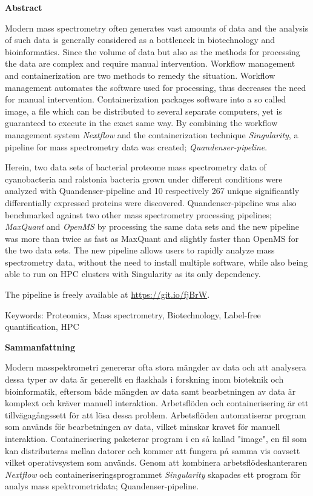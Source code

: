 \begin{center}\normalfont\Large\bfseries\centering Abstract\end{center}
Modern mass spectrometry often generates vast amounts of data and the analysis of such data is generally considered as a bottleneck in biotechnology and bioinformatics. Since the volume of data but also as the methods for processing the data are complex and require manual intervention. Workflow management and containerization are two methods to remedy the situation. Workflow management automates the software used for processing, thus decreases the need for manual intervention. Containerization packages software into a so called image, a file which can be distributed to several separate computers, yet is guaranteed to execute in the exact same way. By combining the workflow management system \textit{Nextflow} and the containerization technique \textit{Singularity}, a pipeline for mass spectrometry data was created; \textit{Quandenser-pipeline}.

Herein, two data sets of bacterial proteome mass spectrometry data of cyanobacteria and ralstonia bacteria grown under different conditions were analyzed with Quandenser-pipeline and 10 respectively 267 unique significantly differentially expressed proteins were discovered. Quandenser-pipeline was also benchmarked against two other mass spectrometry processing pipelines; \textit{MaxQuant} and \textit{OpenMS} by processing the same data sets and the new pipeline was more than twice as fast as MaxQuant and slightly faster than OpenMS for the two data sets. The new pipeline allows users to rapidly analyze mass spectrometry data, without the need to install multiple software, while also being able to run on HPC clusters with Singularity as its only dependency.

The pipeline is freely available at \url{https://git.io/fjBrW}.

\vspace{2cm}

Keywords: Proteomics, Mass spectrometry, Biotechnology, Label-free quantification, HPC

\newpage

\begin{center}\normalfont\Large\bfseries\centering Sammanfattning\end{center}
Modern masspektrometri genererar ofta stora mängder av data och att analysera dessa typer av data är generellt en flaskhals i forskning inom bioteknik och bioinformatik, eftersom både mängden av data samt bearbetningen av data är komplext och kräver manuell interaktion. Arbetsflöden och containerisering är ett tillvägagångssett för att lösa dessa problem. Arbetsflöden automatiserar program som används för bearbetningen av data, vilket minskar kravet för manuell interaktion. Containerisering paketerar program i en så kallad "image", en fil som kan distributeras mellan datorer och kommer att fungera på samma vis oavsett vilket operativsystem som används. Genom att kombinera arbetsflödeshanteraren \textit{Nextflow} och containeriseringsprogrammet \textit{Singularity} skapades ett program för analys mass spektrometridata; Quandenser-pipeline.

